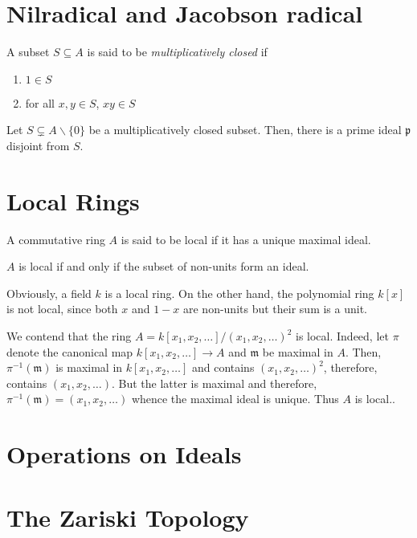 \section{Nilradical and Jacobson radical}

\begin{definition}
    A subset $S\subseteq A$ is said to be \textit{multiplicatively closed} if 
    \begin{enumerate}[label=(\alph*)]
        \item $1\in S$ 
        \item for all $x,y\in S$, $xy\in S$
    \end{enumerate}
\end{definition}

\begin{proposition}
    Let $S\subsetneq A\backslash\{0\}$ be a multiplicatively closed subset. Then, there is a prime ideal $\mathfrak p$ disjoint from $S$.
\end{proposition}

\section{Local Rings}
\begin{definition}
    A commutative ring $A$ is said to be local if it has a unique maximal ideal.
\end{definition}

\begin{proposition}
    $A$ is local if and only if the subset of non-units form an ideal.
\end{proposition}

Obviously, a field $k$ is a local ring. On the other hand, the polynomial ring $k[x]$ is not local, since both $x$ and $1 - x$ are non-units but their sum is a unit. 

We contend that the ring $A = k[x_1,x_2,\ldots]/(x_1,x_2,\ldots)^2$ is local. Indeed, let $\pi$ denote the canonical map $k[x_1,x_2,\ldots]\to A$ and $\mathfrak m$ be maximal in $A$. Then, $\pi^{-1}(\mathfrak m)$ is maximal in $k[x_1,x_2,\ldots]$ and contains $(x_1,x_2,\ldots)^2$, therefore, contains $(x_1,x_2,\ldots)$. But the latter is maximal and therefore, $\pi^{-1}(\mathfrak m) = (x_1,x_2,\ldots)$ whence the maximal ideal is unique. Thus $A$ is local..


\section{Operations on Ideals}
\section{The Zariski Topology}